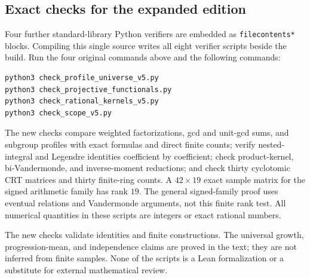 \subsection{Exact checks for the expanded edition}
Four further standard-library Python verifiers are embedded as
\texttt{filecontents*} blocks. Compiling this single source writes all
eight verifier scripts beside the build. Run the four original commands
above and the following commands:
\begin{lstlisting}[language=bash]
python3 check_profile_universe_v5.py
python3 check_projective_functionals.py
python3 check_rational_kernels_v5.py
python3 check_scope_v5.py
\end{lstlisting}
The new checks compare weighted factorizations, gcd and unit-gcd sums,
and subgroup profiles with exact formulas and direct finite counts;
verify nested-integral and Legendre identities coefficient by coefficient;
check product-kernel, bi-Vandermonde, and inverse-moment reductions; and
check thirty cyclotomic CRT matrices and thirty finite-ring counts.
A $42\times19$ exact sample matrix for the signed arithmetic family has
rank $19$. The general signed-family proof uses eventual relations and
Vandermonde arguments, not this finite rank test. All numerical quantities
in these scripts are integers or exact rational numbers.

The new checks validate identities and finite constructions. The universal
growth, progression-mean, and independence claims are proved in the text;
they are not inferred from finite samples. None of the scripts is a Lean
formalization or a substitute for external mathematical review.

